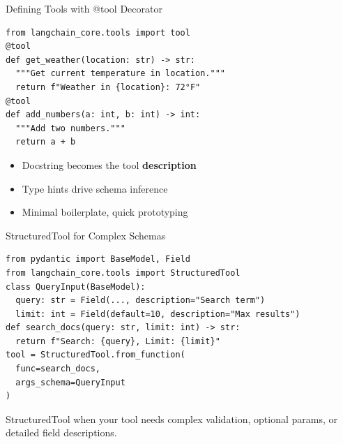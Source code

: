 \documentclass[aspectratio=169,11pt]{beamer}
\begin{document}
\begin{frame}[fragile]{Defining Tools with @tool Decorator}
  \begin{codebox}
    \begin{lstlisting}
from langchain_core.tools import tool
@tool
def get_weather(location: str) -> str:
  """Get current temperature in location."""
  return f"Weather in {location}: 72°F"
@tool
def add_numbers(a: int, b: int) -> int:
  """Add two numbers."""
  return a + b
    \end{lstlisting}
  \end{codebox}
  \vspace{0.1cm}
  \begin{tipbox}
    \setlength{\itemsep}{1pt}
    \begin{itemize}
      \item Docstring becomes the tool \textbf{description}
      \item Type hints drive schema inference
      \item Minimal boilerplate, quick prototyping
    \end{itemize}
  \end{tipbox}
\end{frame}

\begin{frame}[fragile]{StructuredTool for Complex Schemas}
  \begin{codebox}
    \begin{lstlisting}
from pydantic import BaseModel, Field
from langchain_core.tools import StructuredTool
class QueryInput(BaseModel):
  query: str = Field(..., description="Search term")
  limit: int = Field(default=10, description="Max results")
def search_docs(query: str, limit: int) -> str:
  return f"Search: {query}, Limit: {limit}"
tool = StructuredTool.from_function(
  func=search_docs,
  args_schema=QueryInput
)
    \end{lstlisting}
  \end{codebox}
  \vspace{0.1cm}
  \begin{conceptbox}
    StructuredTool when your tool needs complex validation, optional params, or detailed field descriptions.
  \end{conceptbox}
\end{frame}
\end{document}
